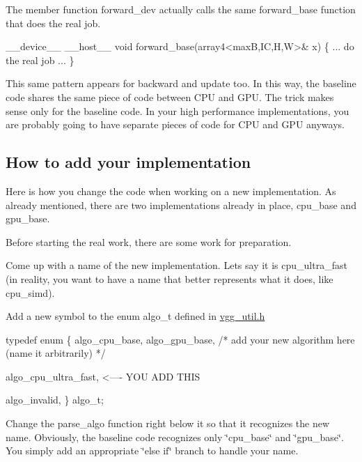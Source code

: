The member function forward\+\_\+dev actually calls the same forward\+\_\+base function that does the real job.


\begin{DoxyCode}
\_\_device\_\_ \_\_host\_\_ 
void forward\_base(array4<maxB,IC,H,W>& x) \{
  ... do the real job ...
\}
\end{DoxyCode}


This same pattern appears for backward and update too. In this way, the baseline code shares the same piece of code between C\+PU and G\+PU. The trick makes sense only for the baseline code. In your high performance implementations, you are probably going to have separate pieces of code for C\+PU and G\+PU anyways.

\subsection*{How to add your implementation }

Here is how you change the code when working on a new implementation. As already mentioned, there are two implementations already in place, cpu\+\_\+base and gpu\+\_\+base.

Before starting the real work, there are some work for preparation.


\begin{DoxyItemize}
\item Come up with a name of the new implementation. Let\textquotesingle{}s say it is cpu\+\_\+ultra\+\_\+fast (in reality, you want to have a name that better represents what it does, like cpu\+\_\+simd).
\item Add a new symbol to the enum algo\+\_\+t defined in \hyperlink{vgg__util_8h}{vgg\+\_\+util.\+h} 
\begin{DoxyCode}
typedef enum \{
  algo\_cpu\_base,
  algo\_gpu\_base,
  /* add your new algorithm here (name it arbitrarily) */

  algo\_cpu\_ultra\_fast, <----  YOU ADD THIS

  algo\_invalid,
\} algo\_t;
\end{DoxyCode}

\item Change the parse\+\_\+algo function right below it so that it recognizes the new name. Obviously, the baseline code recognizes only \char`\"{}cpu\+\_\+base\char`\"{} and \char`\"{}gpu\+\_\+base\char`\"{}. You simply add an appropriate \char`\"{}else if\char`\"{} branch to handle your name.
\end{DoxyItemize}


